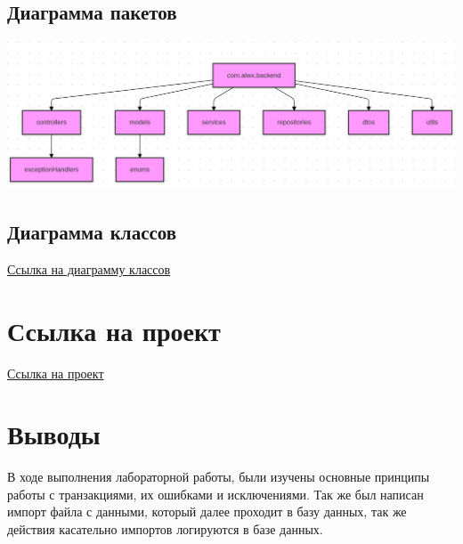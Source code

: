 \documentclass{article}
\begin{document}
    \subsection{Диаграмма пакетов}
        \begin{center}
            \includegraphics[width=.9\textwidth]{package_uml.png}
        \end{center}

\subsection{Диаграмма классов}
\href{https://www.mermaidchart.com/raw/7b97b9f2-bd1a-4381-be9d-0ba2c8f43344?theme=light&version=v0.1&format=svg}{Ссылка на диаграмму классов}

\section{Ссылка на проект}
\href{https://github.com/Alex-de-bug/Information-systems-itmo/tree/main/lab2spring}{Ссылка на проект}

\section{Выводы}
        В ходе выполнения лабораторной работы, были изучены основные принципы работы с транзакциями, их ошибками и исключениями.
        Так же был написан импорт файла с данными, который далее проходит в базу данных, так же действия касательно импортов логируются в базе данных.
\end{document}
